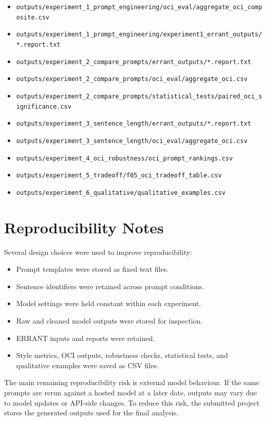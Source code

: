 \begin{itemize}
    \item \texttt{outputs/experiment\_1\_prompt\_engineering/oci\_eval/aggregate\_oci\_composite.csv}
    \item \texttt{outputs/experiment\_1\_prompt\_engineering/experiment1\_errant\_outputs/*.report.txt}
    \item \texttt{outputs/experiment\_2\_compare\_prompts/errant\_outputs/*.report.txt}
    \item \texttt{outputs/experiment\_2\_compare\_prompts/oci\_eval/aggregate\_oci.csv}
    \item \texttt{outputs/experiment\_2\_compare\_prompts/statistical\_tests/paired\_oci\_significance.csv}
    \item \texttt{outputs/experiment\_3\_sentence\_length/errant\_outputs/*.report.txt}
    \item \texttt{outputs/experiment\_3\_sentence\_length/oci\_eval/aggregate\_oci.csv}
    \item \texttt{outputs/experiment\_4\_oci\_robustness/oci\_prompt\_rankings.csv}
    \item \texttt{outputs/experiment\_5\_tradeoff/f05\_oci\_tradeoff\_table.csv}
    \item \texttt{outputs/experiment\_6\_qualitative/qualitative\_examples.csv}
\end{itemize}

\section{Reproducibility Notes}

Several design choices were used to improve reproducibility:

\begin{itemize}
    \item Prompt templates were stored as fixed text files.
    \item Sentence identifiers were retained across prompt conditions.
    \item Model settings were held constant within each experiment.
    \item Raw and cleaned model outputs were stored for inspection.
    \item ERRANT inputs and reports were retained.
    \item Style metrics, OCI outputs, robustness checks, statistical tests, and qualitative examples were saved as CSV files.
\end{itemize}

The main remaining reproducibility risk is external model behaviour. If the same prompts are rerun against a hosted model at a later date, outputs may vary due to model updates or API-side changes. To reduce this risk, the submitted project stores the generated outputs used for the final analysis.
